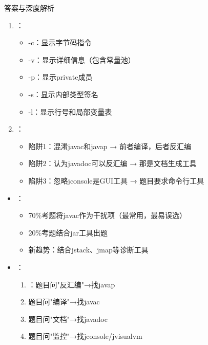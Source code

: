 \documentclass[12pt, a4paper]{ctexart}
\begin{document}
\begin{enumerate}[label=\textbf{\arabic*.}]
\begin{bluebox}{答案与深度解析}
\begin{enumerate}[leftmargin=*, nosep]
			      \item {}：
			            \begin{itemize}
				            \item -c：显示字节码指令
				            \item -v：显示详细信息（包含常量池）
				            \item -p：显示private成员
				            \item -s：显示内部类型签名
				            \item -l：显示行号和局部变量表
			            \end{itemize}

			      \item {}：
			            \begin{itemize}
				            \item 陷阱1：混淆javac和javap → 前者编译，后者反汇编
				            \item 陷阱2：认为javadoc可以反汇编 → 那是文档生成工具
				            \item 陷阱3：忽略jconsole是GUI工具 → 题目要求命令行工具
			            \end{itemize}
		      \end{enumerate}

		      \begin{itemize}[leftmargin=*, nosep]
			      \item {}：
			            \begin{itemize}
				            \item 70\%考题将javac作为干扰项（最常用，最易误选）
				            \item 20\%考题结合jar工具出题
				            \item 新趋势：结合jstack、jmap等诊断工具
			            \end{itemize}

			      \item {}：
			            \begin{enumerate}
				            \item {}：题目问"反汇编"→找javap
				            \item 题目问"编译"→找javac
				            \item 题目问"文档"→找javadoc
				            \item 题目问"监控"→找jconsole/jvisualvm
			            \end{enumerate}


\end{itemize}
\end{bluebox}
\end{enumerate}
\end{document}
